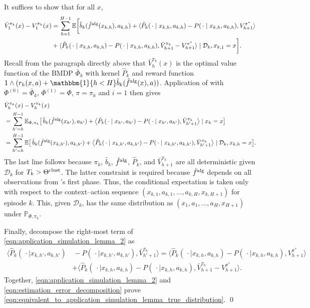 \documentclass[11pt]{article}
\newcommand{\mcD}{\mathcal{D}}
\newcommand{\mbbP}{\mathbb{P}}
\newcommand{\mbbE}{\mathbb{E}}
\newcommand{\clust}{\textnormal{clust}}
\newcommand{\alg}{\textnormal{alg}}
\theoremstyle{definition}
\theoremstyle{definition}
\begin{document}
It suffices to show that for all $x$,
\begin{align}
	\bar{V}^{\pi_k}_1(x)
	-
	V^{\pi_k}_1(x)
	 &
	=
	\sum_{h=1}^{H-1}\mbbE\biggl[\hat{b}_{k}(\hat{f}^{\alg}(x_{k,h}),a_{k,h})
	+
	\langle \hat{P}_k(\,\cdot  \mid x_{k,h},a_{k,h})-P(\,\cdot \mid x_{k,h},a_{k,h}), V^{\pi^*}_{h+1}\rangle
	\nonumber
	\\
	 &
	+
	\langle \hat{P}_k(\,\cdot  \mid x_{k,h},a_{k,h})-P(\,\cdot  \mid x_{k,h},a_{k,h}), \bar{V}^{\pi_k}_{h+1}-V^{\pi^*}_{h+1}\rangle
	\mid \mcD_k, x_{k,1} = x \biggr]
	.
	\label{eqn:equivalent_to_application_simulation_lemma_true_distribution}
\end{align}
Recall from the paragraph directly above  that $\bar{V}^{\pi_k}_h(x)$ is the optimal value function of the \gls{BMDP} $\bar{\Phi}_k$ with kernel $\hat{P}_k$ and reward function $1\wedge (r_h(x,a)+\mathbbm{1}\{h < H\}\hat{b}_k(\hat{f}^{\alg}(x),a))$.
Application of  with $\Phi^{(0)}=\bar{\Phi}_k$, $\Phi^{(1)}=\Phi$, $\pi = \pi_k$ and $i = 1$ then gives
\begin{align}
	 &
	\bar{V}^{\pi_k}_h(x)-V_h^{\pi_k}(x)
	\nonumber
	\\
	&
	=
	\sum_{h'=h}^{H-1}\mbbE_{\Phi,\pi_k}\bigl[\,\hat{b}_k(\hat{f}^{\alg}(x_{h'}),a_{h'})+\bigl\langle \hat{P}_k(\,\cdot \mid x_{h'},a_{h'})-P(\,\cdot \mid x_{h'},a_{h'}), \bar{V}^{\pi_k}_{h'+1} \bigr\rangle\mid x_h=x\bigr]
	\label{eqn:application_simulation_lemma_2}
	\\
	 &
	=
	\sum_{h'=h}^{H-1}\mbbE\bigl[
	\,\hat{b}_k(\hat{f}^{\alg}(x_{k,h'}),a_{k,h'})
	+
	\bigl\langle \hat{P}_k(\,\cdot \mid x_{k,h'},a_{k,h'})-P(\,\cdot \mid x_{k,h'},a_{k,h'}), \bar{V}^{\pi_k}_{h'+1} \bigr\rangle
	\mid \mcD_k,x_{k,h}=x\bigr].
	\nonumber
\end{align}
The last line follows because $\pi_k$, $\hat{b}_k$, $\hat{f}^{\alg}$, $\hat{P}_k$, and $\bar{V}^{\pi_k}_{h+1}$ are all deterministic given $\mcD_k$ for $T_k>\Theta^{\clust}$.
The latter constraint is required because $\hat{f}^{\alg}$ depends on all observations from 's first phase.
Thus, the conditional expectation is taken only with respect to the context--action sequence $(x_{k,1},a_{k,1},\ldots,a_{k,H},x_{k,H+1})$ for episode $k$.
This, given $\mcD_k$, has the same distribution as $(x_1,a_1,\ldots,a_H,x_{H+1})$ under $\mbbP_{\Phi,\pi_k}$.

Finally, decompose the right-most term of \eqref{eqn:application_simulation_lemma_2} as
\begin{align}
	\nonumber
	\bigl\langle 
		\hat{P}_k(\,\cdot \mid x_{k,h'},a_{k,h'})&\,-P(\,\cdot \mid x_{k,h'},a_{k,h'}),
		\bar{V}^{\pi_k}_{h'+1}
	\bigr\rangle
	=
	\bigl\langle \hat{P}_k(\,\cdot  \mid x_{k,h},a_{k,h})-P(\,\cdot \mid x_{k,h},a_{k,h}), V^{\pi^*}_{h+1}\bigr\rangle
	\\
	&
	+
	\bigl\langle \hat{P}_k(\,\cdot  \mid x_{k,h},a_{k,h})-P(\,\cdot  \mid x_{k,h},a_{k,h}), \bar{V}^{\pi_k}_{h+1}-V^{\pi^*}_{h+1}\bigr\rangle
	.
	\label{eqn:estimation_error_decomposition}
\end{align}
Together, \eqref{eqn:application_simulation_lemma_2} and \eqref{eqn:estimation_error_decomposition} prove \eqref{eqn:equivalent_to_application_simulation_lemma_true_distribution}.
\qed
\end{document}
